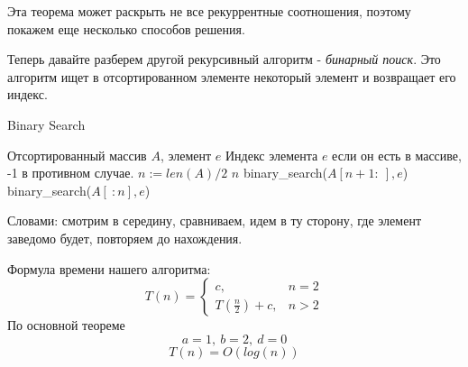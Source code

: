\documentclass[../main.tex]{subfiles}
\begin{document}
	Эта теорема может раскрыть не все рекуррентные соотношения, поэтому покажем еще несколько способов решения.
	
	
	
	Теперь давайте разберем другой рекурсивный алгоритм - \textit{бинарный поиск}. Это алгоритм ищет в отсортированном элементе некоторый элемент и возвращает его индекс.
		
	\begin{algorithm}[H]
		\caption{Binary Search}
		\begin{algorithmic}[1]
			\Require Отсортированный массив $A$, элемент $e$
			\Ensure Индекс элемента $e$ если он есть в массиве, -1 в противном случае.
				\State $n := len(A) / 2$
					\State \Return $n$
					\State \Return binary\_search($A[n + 1: \ ], e$)
				\Else
					\State \Return binary\_search($A[ \ :n], e$)
				\EndIf
			\EndFunction
		\end{algorithmic}
	\end{algorithm}
	Словами: смотрим в середину, сравниваем, идем в ту сторону, где элемент заведомо будет, повторяем до нахождения.
	
	
	\begin{time}
		Формула времени нашего алгоритма:
		\[
		T(n) = 
		\begin{cases}
			c, & n = 2 \\
			T(\frac{n}{2}) + c, & n > 2
		\end{cases}
		\]
		По основной теореме 
		\[
		a = 1, \ b = 2, \ d = 0
		\]
		\[
		T(n) = O(log(n))
		\]
	\end{time}
	
	
	\begin{comment}
	\begin{center}
		\begin{tikzpicture}
			\begin{scope}[every node/.style={circle,thick,draw}]
				\node[label=\large$ cn^d $] (top) at (10, 10) {};
				
				\node[label=left:\Large $ \frac{cn^d}{b^a}$] (mid-left) at (7, 8) {};
				\node (mid-right) at (13, 8) {};
				
				\node (bot-left) at (5, 6) {};
				\node[label=right:\Large $ \frac{cn^d}{b^{2a}} $] (bot-right) at (9, 6) {};
			\end{scope}

			\begin{scope}[>={Stealth[black]}, every edge/.style={draw=black,very thick}]
				\path [->] (top) edge (mid-left);
				\path [->] (top) edge (mid-right);
				
				\path [->] (mid-left) edge (bot-left);
				\path [->] (mid-left) edge (bot-right);
				
				\draw[dashed] (mid-left) -- node[above] {$a$} (mid-right);
				\draw[dashed] (bot-left) -- node[above] {$a$} (bot-right);
			\end{scope}
		\end{tikzpicture}
	\end{center}
	\end{comment}
	
	
\end{document}
